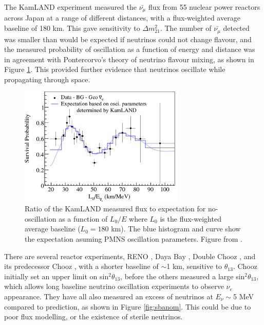 The KamLAND experiment \cite{kamland} measured the $\bar{\nu_{\mu}}$ flux from 55 nuclear power reactors across Japan at a range of different distances, with a flux-weighted average baseline of 180 km. This gave sensitivity to $\Delta m_{21}^{2}$. The number of $\bar{\nu_{\mu}}$ detected was smaller than would be expected if neutrinos could not change flavour, and the measured probability of oscillation as a function of energy and distance was in agreement with Pontercorvo's theory of neutrino flavour mixing, as shown in Figure \ref{fig:kam}. This provided further evidence that neutrinos oscillate while propagating through space.

\begin{figure}
\centering
\includegraphics*[width=0.7\textwidth,clip]{figs/LE-b}
\caption{Ratio of the KamLAND measured flux to expectation for no-oscillation as a function of $L_{0}/E$ where $L_0$ is the flux-weighted average baseline ($L_{0} = 180$ km). The blue histogram and curve show the expectation asuming PMNS oscillation parameters. Figure from \cite{kamlandfig}.} \label{fig:kam}
\end{figure}

There are several reactor experiments, RENO \cite{reno}, Daya Bay \cite{dayabay}, Double Chooz \cite{doublechooz}, and its predecessor Chooz \cite{chooz}, with a shorter baseline of $\sim$1 km, sensitive to $\theta_{13}$. Chooz initially set an upper limit on sin$^2 \theta_{13}$, before the others measured a large sin$^2 \theta_{13}$, which allows long baseline neutrino oscillation experiments to observe $\nu_e$ appearance. They have all also measured an excess of neutrinos at $E_\nu \sim$5 MeV compared to prediction, as shown in Figure \ref{fig:sbanom}. This could be due to poor flux modelling, or the existence of sterile neutrinos.

